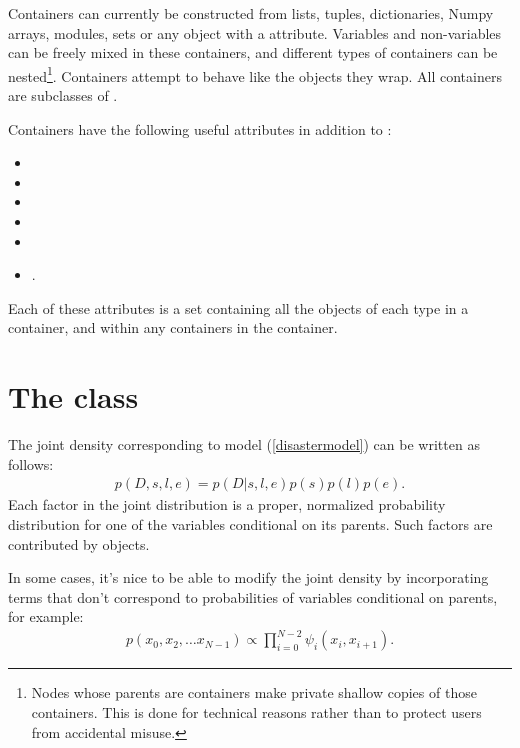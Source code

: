 Containers can currently be constructed from lists, tuples, dictionaries, Numpy arrays, modules, sets or any object with a  attribute. Variables and non-variables can be freely mixed in these containers, and different types of containers can be nested\footnote{Nodes whose parents are containers make private shallow copies of those containers. This is done for technical reasons rather than to protect users from accidental misuse.}. Containers attempt to behave like the objects they wrap. All containers are subclasses of . 

Containers have the following useful attributes in addition to :
\begin{itemize}
    \item{}
    \item{}
    \item{}
    \item{}
    \item{}
    \item{}.
\end{itemize}
Each of these attributes is a set containing all the objects of each type in a container, and within any containers in the container.


\hypertarget{potential}{}
\section*[The Potential class]{The  class} \label{potential}


The joint density corresponding to model (\ref{disastermodel}) can be written as follows:
\begin{eqnarray*}
    p(D,s,l,e) = p(D|s,l,e) p(s) p(l) p(e).
\end{eqnarray*}
Each factor in the joint distribution is a proper, normalized probability distribution for one of the variables conditional on its parents. Such factors are contributed by  objects.

In some cases, it's nice to be able to modify the joint density by incorporating terms that don't correspond to probabilities of variables conditional on parents, for example:
\begin{eqnarray*}
    p(x_0, x_2, \ldots x_{N-1}) \propto \prod_{i=0}^{N-2} \psi_i(x_i, x_{i+1}).
\end{eqnarray*}


